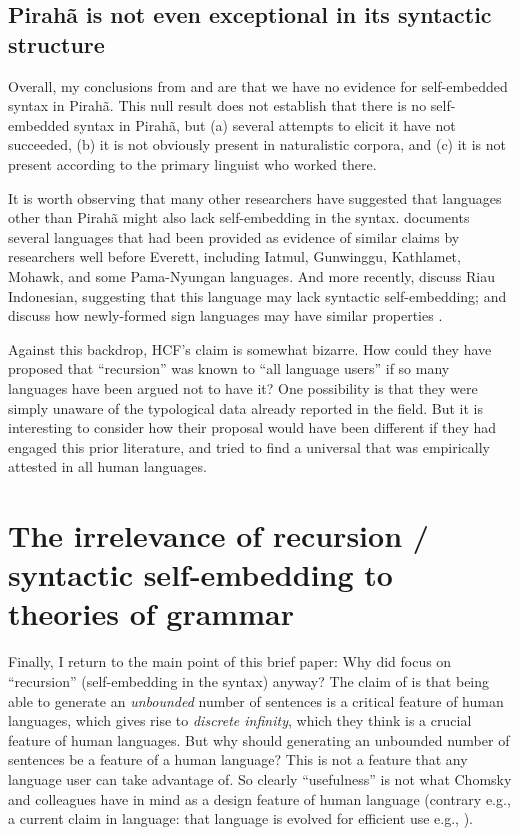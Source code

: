 \documentclass{article}
\begin{document}
\subsection{Pirahã is not even exceptional in its syntactic structure}

Overall, my conclusions from \citet{futrell2016corpus} and \citet{sauerland2018false} are that we have no evidence for self-embedded syntax in Pirahã. This null result does not establish that there is no self-embedded syntax in Pirahã, but (a) several attempts to elicit it have not succeeded, (b) it is not obviously present in naturalistic corpora, and (c) it is not present according to the primary linguist who worked there.

It is worth observing that many other researchers have suggested that languages other than Pirahã might also lack self-embedding in the syntax. \citet{pullum2023daniel} documents several languages that had been provided as evidence of similar claims by researchers well before Everett, including Iatmul, Gunwinggu, Kathlamet, Mohawk, and some Pama-Nyungan languages. And more recently, \citet{gil2009much, jackendoff2014what, gil2023hierarchical} discuss Riau Indonesian, suggesting that this language may lack syntactic self-embedding; and \citet{jackendoff2014what} discuss how newly-formed sign languages may have similar properties \citep{goldin2005resilience, sandler2005emergence}.

Against this backdrop, HCF's claim is somewhat bizarre. How could they have proposed that ``recursion'' was known to ``all language users'' if so many languages have been argued not to have it? One possibility is that they were simply unaware of the typological data already reported in the field. But it is interesting to consider how their proposal would have been different if they had engaged this prior literature, and tried to find a universal that was empirically attested in all human languages. 

\section{The irrelevance of recursion / syntactic self-embedding to theories of grammar}
\label{irrel_recursion_sec}

Finally,  I return to the main point of this brief paper: Why did \citet{hauser2002faculty} focus on ``recursion'' (self-embedding in the syntax) anyway?  The claim of \citet{hauser2002faculty} is that being able to generate an \textit{unbounded} number of sentences is a critical feature of human languages, which gives rise to \textit{discrete infinity}, which they think is a crucial feature of human languages.  But why should generating an unbounded number of sentences be a feature of a human language?  This is not a feature that any language user can take advantage of. So clearly ``usefulness'' is not what Chomsky and colleagues have in mind as a design feature of human language (contrary e.g., a current claim in language: that language is evolved for efficient use e.g., \citealt{gibson2019efficiency}).
\end{document}
